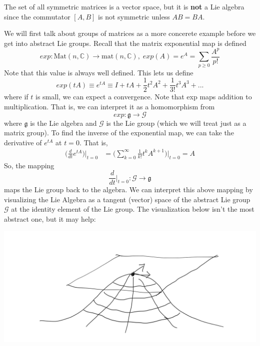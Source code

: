   \begin{example}
    The set of all symmetric matrices is a vector space, but it is \textbf{not} a Lie algebra since the commutator $[A,B]$ is not symmetric unless $A B = B A$. 
  \end{example}

  We will first talk about groups of matrices as a more concerete example before we get into abstract Lie groups. Recall that the matrix exponential map is defined
  \begin{equation}
    exp: \text{Mat}(n, \mathbb{C}) \rightarrow \text{mat}(n, \mathbb{C}), \; exp(A) = e^A = \sum_{p \geq 0} \frac{A^p}{p!}
  \end{equation}
  Note that this value is always well defined. This lets us define
  \begin{equation}
    exp(t A) \equiv e^{t A} \equiv I + tA + \frac{1}{2} t^2 A^2 + \frac{1}{3!} t^3 A^3 + ... 
  \end{equation}
  where if $t$ is small, we can expect a convergence. Note that exp maps addition to multiplication. That is, we can interpret it as a homomorphism from 
  \begin{equation}
    exp: \mathfrak{g} \rightarrow \mathcal{G}
  \end{equation}
  where $\mathfrak{g}$ is the Lie algebra and $\mathcal{G}$ is the Lie group (which we will treat just as a matrix group). To find the inverse of the exponential map, we can take the derivative of $e^{tA}$ at $t=0$. That is, 
  \begin{align*}
    \bigg(\frac{d}{d t} e^{tA} \bigg) \bigg|_{t=0} & = \bigg(\sum_{k=0}^\infty \frac{1}{k!} t^k A^{k+1} \bigg) \bigg|_{t=0} = A
  \end{align*}
  So, the mapping
  \begin{equation}
    \frac{d}{dt} \bigg|_{t=0}: \mathcal{G} \rightarrow \mathfrak{g}
  \end{equation}
  maps the Lie group back to the algebra. We can interpret this above mapping by visualizing the Lie Algebra as a tangent (vector) space of the abstract Lie group $\mathcal{G}$ at the identity element of the Lie group. The visualization below isn't the most abstract one, but it may help:
  \begin{center}
    \includegraphics[scale=0.2]{img/Lie_Algebra_Tangent_Space.PNG}
  \end{center}
